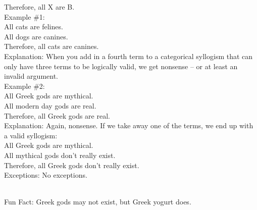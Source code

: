 \documentclass[a4paper,12pt,single,pdftex]{scrbook}
\begin{document}
    
      Therefore, all X are B.
    \\

    
      Example \#1:
    \\

    
      All cats are felines.
    \\

    
      All dogs are canines.
    \\

    
      Therefore, all cats are canines.
    \\

    
      Explanation: When you add in a fourth term to a categorical syllogism that can only have three terms to be logically valid, we get nonsense -- or at least an invalid argument. 
    \\

    
      Example \#2:
    \\

    
      All Greek gods are mythical.
    \\

    
      All modern day gods are real.
    \\

    
      Therefore, all Greek gods are real.
    \\

    
      Explanation: Again, nonsense.  If we take away one of the terms, we end up with a valid syllogism:
    \\

    
      All Greek gods are mythical.
    \\

    
      All mythical gods don’t really exist.
    \\

    
      Therefore, all Greek gods don’t really exist.
    \\

    
      Exceptions: No exceptions. \newline

    \\

    
      Fun Fact: Greek gods may not exist, but Greek yogurt does.
    \\
\end{document}
